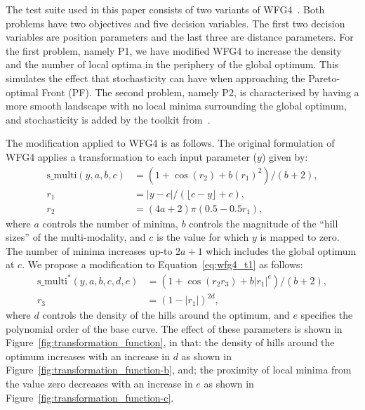 \documentclass{llncs}
\begin{document}
The test suite used in this paper consists of two variants of WFG4~\cite{bib:wfg_2006}. Both problems have two objectives and five decision variables. The first two decision variables are position parameters and the last three are distance parameters. For the first problem, namely P1, we have modified WFG4 to increase the density and the number of local optima in the periphery of the global optimum. This simulates the effect that stochasticity can have when approaching the Pareto-optimal Front (PF). The second problem, namely P2, is characterised by having a more smooth landscape with no local minima surrounding the global optimum, and stochasticity is added by the toolkit from~\cite{Salomon2016Toolkit}.

The modification applied to WFG4 is as follows. The original formulation of WFG4 applies a transformation to each input parameter ($y$) given by:
\begin{equation}
\begin{aligned}
 \text{s\_multi}(y,a,b,c) &= \left(1+\cos(r_2) + b (r_1)^2 \right)/(b+2),\\
 r_1 &= |y-c| / (\lfloor c-y \rfloor +c ),\\
 r_2 &= (4a+2)\pi ( 0.5 - 0.5r_1 ),
 \label{eq:wfg4_t1}
\end{aligned}
 \end{equation}
where $a$ controls the number of minima, $b$ controls the magnitude of the ``hill sizes'' of the multi-modality, and $c$ is the value for which $y$ is mapped to zero. The number of minima increases up-to $2a+1$ which includes the global optimum at $c$. We propose a modification to Equation~\ref{eq:wfg4_t1} as follows:
\begin{equation}
\begin{aligned}
 \text{s\_multi}^*(y,a,b,c,d,e) &= \left( 1+\cos(r_2 r_3) +b|r_1|^e  \right)/(b+2),\\
 r_3 &= (1-|r_1|)^{2d},
\end{aligned}
 \label{eq:wfg4_t1_mod}
\end{equation}
where $d$ controls the density of the hills around the optimum, and $e$ specifies the polynomial order of the base curve. The effect of these parameters is shown in Figure~\ref{fig:transformation_function}, in that: the density of hills around the optimum increases with an increase in $d$ as shown in Figure~\ref{fig:transformation_function-b}, and; the proximity of local minima from the value zero decreases with an increase in $e$ as shown in Figure~\ref{fig:transformation_function-c}.
\end{document}
